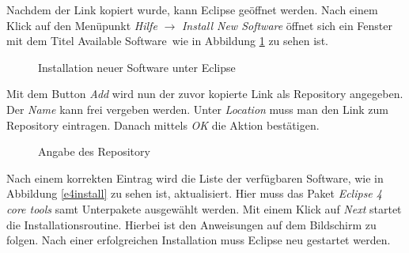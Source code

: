 Nachdem der Link kopiert wurde, kann Eclipse geöffnet werden. Nach einem Klick auf den Menüpunkt \textit{Hilfe} $\rightarrow$ \textit{Install New Software} öffnet sich ein Fenster mit dem Titel \glqq Available Software\grqq\ wie in Abbildung \ref{installnew} zu sehen ist. 

\begin{figure}[H]
  \vspace{0.5cm}
  \centering
  \caption{Installation neuer Software unter Eclipse}
  \label{installnew}
  \vspace{0.5cm}
\end{figure}

Mit dem Button \textit{Add} wird nun der zuvor kopierte Link als Repository angegeben. Der \textit{Name} kann frei vergeben werden. Unter \textit{Location} muss man den Link zum Repository eintragen. Danach mittels \textit{OK} die Aktion bestätigen.

\begin{figure}[H]
  \vspace{0.5cm}
  \centering
  \caption{Angabe des Repository}
  \label{insertrepo}
  \vspace{0.5cm}
\end{figure}

Nach einem korrekten Eintrag wird die Liste der verfügbaren Software, wie in Abbildung \ref{e4install} zu sehen ist, aktualisiert. Hier muss das Paket \textit{Eclipse 4 core tools} samt Unterpakete ausgewählt werden. Mit einem Klick auf \textit{Next} startet die Installationsroutine. Hierbei ist den Anweisungen auf dem Bildschirm zu folgen. Nach einer erfolgreichen Installation muss Eclipse neu gestartet werden.

